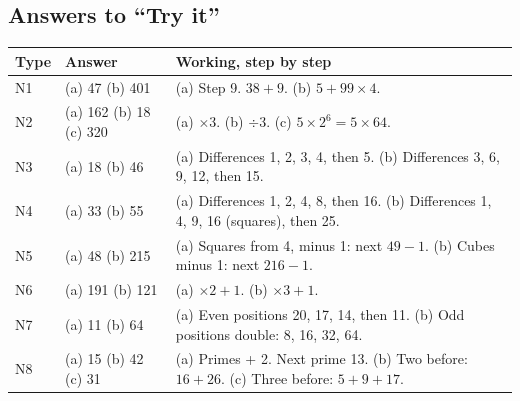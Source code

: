 \documentclass[11pt,a4paper]{article}
\let\oldsubsection\subsection
\renewcommand{\subsection}{\needspace{9\baselineskip}\oldsubsection}
\begin{document}
\subsection*{Answers to ``Try it''}
\begin{center}\small\renewcommand{\arraystretch}{1.25}\setlength{\tabcolsep}{8pt}
\begin{tabularx}{\linewidth}{@{}l>{\raggedright\arraybackslash}p{3.4cm}>{\raggedright\arraybackslash}X@{}}
\toprule
\textbf{\color{slate}Type} & \textbf{\color{slate}Answer} & \textbf{\color{slate}Working, step by step} \\ \midrule
N1 & (a) 47 \newline (b) 401 & (a) Step 9. $38 + 9$. \newline (b) $5 + 99 \times 4$. \\
N2 & (a) 162 \newline (b) 18 \newline (c) 320 & (a) $\times 3$. \newline (b) $\div 3$. \newline (c) $5 \times 2^6 = 5 \times 64$. \\
N3 & (a) 18 \newline (b) 46 & (a) Differences 1, 2, 3, 4, then 5. \newline (b) Differences 3, 6, 9, 12, then 15. \\
N4 & (a) 33 \newline (b) 55 & (a) Differences 1, 2, 4, 8, then 16. \newline (b) Differences 1, 4, 9, 16 (squares), then 25. \\
N5 & (a) 48 \newline (b) 215 & (a) Squares from 4, minus 1: next $49 - 1$. \newline (b) Cubes minus 1: next $216 - 1$. \\
N6 & (a) 191 \newline (b) 121 & (a) $\times 2 + 1$. \newline (b) $\times 3 + 1$. \\
N7 & (a) 11 \newline (b) 64 & (a) Even positions 20, 17, 14, then 11. \newline (b) Odd positions double: 8, 16, 32, 64. \\
N8 & (a) 15 \newline (b) 42 \newline (c) 31 & (a) Primes + 2. Next prime 13. \newline (b) Two before: $16 + 26$. \newline (c) Three before: $5 + 9 + 17$. \\

\end{tabularx}
\end{center}
\end{document}
